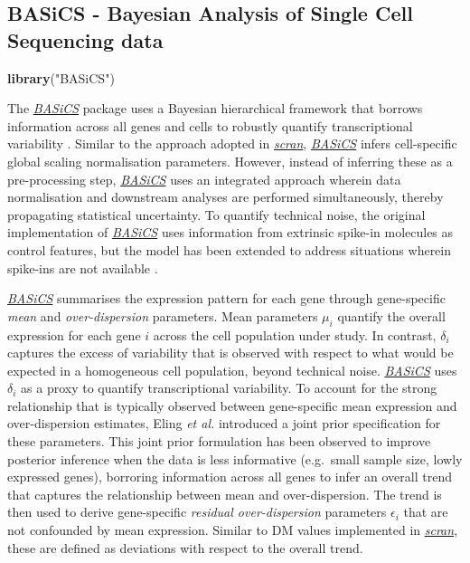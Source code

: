 \documentclass[9pt,a4paper,]{extarticle}
\newenvironment{Shaded}{\begin{snugshade}}{\end{snugshade}}
\newcommand{\KeywordTok}[1]{\textcolor[rgb]{0.13,0.29,0.53}{\textbf{#1}}}
\newcommand{\NormalTok}[1]{#1}
\newcommand{\StringTok}[1]{\textcolor[rgb]{0.31,0.60,0.02}{#1}}
\begin{document}
\hypertarget{basics---bayesian-analysis-of-single-cell-sequencing-data}{%
\subsection{BASiCS - Bayesian Analysis of Single Cell Sequencing data}\label{basics---bayesian-analysis-of-single-cell-sequencing-data}}

\begin{Shaded}
\begin{Highlighting}[]
\KeywordTok{library}\NormalTok{(}\StringTok{"BASiCS"}\NormalTok{)}
\end{Highlighting}
\end{Shaded}

The \emph{\href{https://bioconductor.org/packages/3.11/BASiCS}{BASiCS}} package uses a Bayesian hierarchical framework
that borrows information across all genes and cells to robustly quantify
transcriptional variability \citep{Vallejos2015BASiCS}.
Similar to the approach adopted in \emph{\href{https://bioconductor.org/packages/3.11/scran}{scran}}, \emph{\href{https://bioconductor.org/packages/3.11/BASiCS}{BASiCS}}
infers cell-specific global scaling normalisation parameters.
However, instead of inferring these as a pre-processing step,
\emph{\href{https://bioconductor.org/packages/3.11/BASiCS}{BASiCS}} uses an integrated approach wherein data normalisation
and downstream analyses are performed simultaneously, thereby propagating
statistical uncertainty.
To quantify technical noise, the original implementation of
\emph{\href{https://bioconductor.org/packages/3.11/BASiCS}{BASiCS}} uses information from extrinsic spike-in molecules as
control features, but the model has been extended to address situations wherein
spike-ins are not available \citep{Eling2018}.

\emph{\href{https://bioconductor.org/packages/3.11/BASiCS}{BASiCS}} summarises the expression pattern for each gene through
gene-specific \emph{mean} and \emph{over-dispersion} parameters.
Mean parameters \(\mu_i\) quantify the overall expression for each gene \(i\)
across the cell population under study.
In contrast, \(\delta_i\) captures the excess of variability that is observed with
respect to what would be expected in a homogeneous cell population, beyond
technical noise.
\emph{\href{https://bioconductor.org/packages/3.11/BASiCS}{BASiCS}} uses \(\delta_i\) as a proxy to quantify transcriptional
variability.
To account for the strong relationship that is typically observed
between gene-specific mean expression and over-dispersion estimates,
Eling \emph{et al.} \citep{Eling2018} introduced a joint prior specification for
these parameters.
This joint prior formulation has been observed to improve posterior inference
when the data is less informative (e.g.~small sample size, lowly expressed
genes), borroring information across all genes to infer an overall trend that
captures the relationship between mean and over-dispersion.
The trend is then used to derive gene-specific \emph{residual over-dispersion}
parameters \(\epsilon_i\) that are not confounded by mean expression.
Similar to DM values implemented in \emph{\href{https://bioconductor.org/packages/3.11/scran}{scran}}, these are defined as
deviations with respect to the overall trend.
\end{document}
